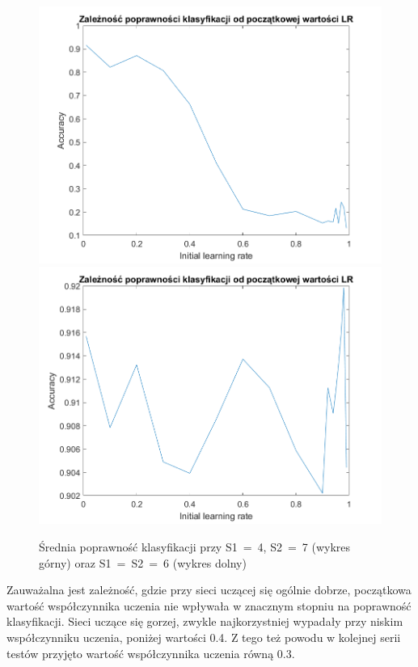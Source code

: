 \documentclass[12pt,twoside]{article}
\begin{document}
\begin{figure}[ht]
	\centering
	\includegraphics[width=16cm]{figures/Lr1.png}
	\includegraphics[width=16cm]{figures/Lr2.png}
	\caption{Średnia poprawność klasyfikacji przy S1~=~4, S2~=~7 (wykres górny) oraz S1~=~S2~=~6 (wykres dolny)}
	\label{Fig:Lr1}
\end{figure}
Zauważalna jest zależność, gdzie przy sieci uczącej się ogólnie dobrze, początkowa wartość współczynnika uczenia nie wpływała w znacznym stopniu na poprawność klasyfikacji.
Sieci uczące się gorzej, zwykle najkorzystniej wypadały przy niskim współczynniku uczenia, poniżej wartości 0.4.
Z tego też powodu w kolejnej serii testów przyjęto wartość współczynnika uczenia równą 0.3.
\end{document}
